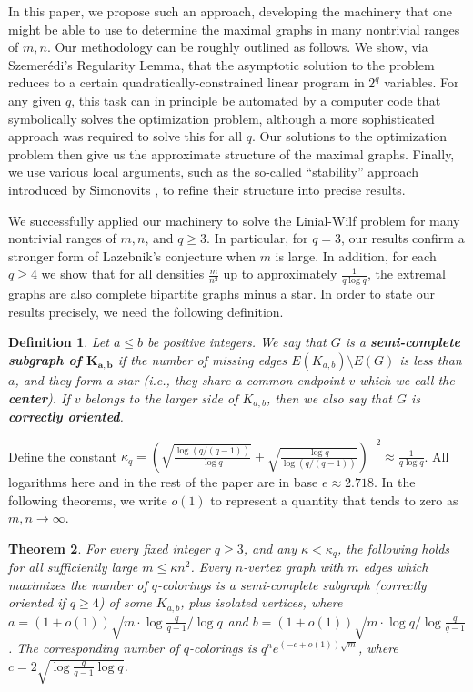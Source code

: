 \documentclass[11pt]{article}
\newtheorem{theorem}{Theorem}[section]
\newtheorem{definition}[theorem]{Definition}
\begin{document}
In this paper, we propose such an approach, developing the machinery
that one might be able to use to determine the maximal graphs in many
nontrivial ranges of $m,n$.  Our methodology can be roughly outlined
as follows.  We show, via Szemer\'edi's Regularity Lemma, that the
asymptotic solution to the problem reduces to a certain
quadratically-constrained linear program in $2^q$ variables.  For any
given $q$, this task can in principle be automated by a computer code
that symbolically solves the optimization problem, although a more
sophisticated approach was required to solve this for all $q$.  Our
solutions to the optimization problem then give us the approximate
structure of the maximal graphs.  Finally, we use various local
arguments, such as the so-called ``stability'' approach introduced by
Simonovits \cite{Simonovits}, to refine their structure into precise
results.

We successfully applied our machinery to solve the Linial-Wilf problem
for many nontrivial ranges of $m,n$, and $q \geq 3$.  In particular,
for $q=3$, our results confirm a stronger form of Lazebnik's
conjecture when $m$ is large.  In addition, for each $q \geq 4$ we
show that for all densities $\frac{m}{n^2}$ up to approximately
$\frac{1}{q \log q}$, the extremal graphs are also complete bipartite
graphs minus a star.  In order to state our results precisely, we need
the following definition.

\begin{definition}
  \label{def:semi-complete}
  Let $a \leq b$ be positive integers.  We say that $G$ is a
  \textbf{semi-complete subgraph of $\boldsymbol{K_{a,b}}$} if the
  number of missing edges $E(K_{a,b}) \setminus E(G)$ is less than
  $a$, and they form a star (i.e., they share a common endpoint $v$
  which we call the \textbf{center}).  If $v$ belongs to the larger
  side of $K_{a,b}$, then we also say that $G$ is \textbf{correctly
    oriented}.
\end{definition}

Define the constant $\kappa_q = \left( \sqrt{\frac{\log (q/(q-1))}{\log
      q}} + \sqrt{\frac{\log q}{\log (q/(q-1))}} \right)^{-2} \approx
\frac{1}{q \log q}$.  All logarithms here and in the rest of the paper
are in base $e \approx 2.718$.  In the following theorems, we write
$o(1)$ to represent a quantity that tends to zero as $m,n \rightarrow
\infty$.

\begin{theorem}
  \label{thm:main:sparse}
  For every fixed integer $q \geq 3$, and any $\kappa < \kappa_q$, the
  following holds for all sufficiently large $m \leq \kappa n^2$.  Every
  $n$-vertex graph with $m$ edges which maximizes the number of
  $q$-colorings is a semi-complete subgraph (correctly oriented if $q
  \geq 4$) of some $K_{a,b}$, plus isolated vertices, where $a =
  (1+o(1))\sqrt{m \cdot \log \frac{q}{q-1} / \log q}$ and $b =
  (1+o(1)) \sqrt{m \cdot \log q / \log \frac{q}{q-1}}$.  The
  corresponding number of $q$-colorings is $q^n
  e^{(-c+o(1))\sqrt{m}}$, where $c = 2\sqrt{\log \frac{q}{q-1} \log
    q}$.
\end{theorem}
\end{document}

